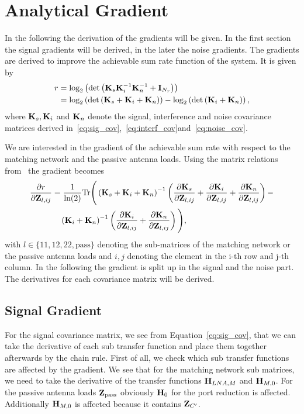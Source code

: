 \chapter{Analytical Gradient}

In the following the derivation of the gradients will be given.
In the first section the signal gradients will be derived, in the later the noise gradients.
The gradients are derived to improve the achievable sum rate function of the system.
It is given by
\begin{align}
\label{eq:sum_rate}
r &= \text{log}_2\left(\text{det}\left(
		\mathbf{K}_s\mathbf{K}_i^{-1}\mathbf{K}_n^{-1} + \mathbf{I}_{N_r}\right)\right)\\\nonumber 
&= \text{log}_2\left(\text{det}\left(
		\mathbf{K}_s+\mathbf{K}_i+\mathbf{K}_n\right)\right) -
		\text{log}_2\left(\text{det}\left(\mathbf{K}_i+\mathbf{K}_n\right)\right),
\end{align}
where $\mathbf{K}_s, \mathbf{K}_i$ and $\mathbf{K}_n$ denote the signal, interference and noise covariance matrices derived in~\eqref{eq:sig_cov},~\eqref{eq:interf_cov}and~\eqref{eq:noise_cov}.

We are interested in the gradient of the achievable sum rate with respect to the matching network and the passive antenna loads.
Using the matrix relations from~\cite{Codebook12} the gradient becomes
\begin{align}
\label{eq:gradient}\nonumber
\frac{\partial r}{\partial\mathbf{Z}_{l,ij}} &= \frac{1}{\text{ln}(2)} 
\text{Tr}\Bigg(\left(\mathbf{K}_s + \mathbf{K}_i + \mathbf{K}_n\right)^{-1}
\left(\frac{\partial\mathbf{K}_s}{\partial\mathbf{Z}_{l,ij}}+
 \frac{\partial\mathbf{K}_i}{\partial\mathbf{Z}_{l,ij}}+
 \frac{\partial\mathbf{K}_n}{\partial\mathbf{Z}_{l,ij}}\right)-\\
 &\quad\left(\mathbf{K}_i+\mathbf{K}_n\right)^{-1}
 \left(\frac{\partial\mathbf{K}_i}{\partial\mathbf{Z}_{l,ij}}+
 	\frac{\partial\mathbf{K}_n}{\partial\mathbf{Z}_{l,ij}}\right)\Bigg),
\end{align}
with $l\in\{11,12,22,\text{pass}\}$ denoting the sub-matrices of the matching network or the passive antenna loads and $i,j$ denoting the element in the i-th row and j-th column.
In the following the gradient is split up in the signal and the noise part.
The derivatives for each covariance matrix will be derived.

\section{Signal Gradient}
\label{sec:signal_gradient}
 For the signal covariance matrix, we see from Equation~\eqref{eq:sig_cov}, that we can take the derivative of each sub transfer function and place them together afterwards by the chain rule.
First of all, we check which sub transfer functions are affected by the gradient.
We see that for the matching network sub matrices, we need to take the derivative of the transfer functions $\mathbf{H}_{LNA,M}$ and $\mathbf{H}_{M,0}$.
For the passive antenna loads $\mathbf{Z}_\text{pass}$ obviously $\mathbf{H}_{0}$ for the port reduction is affected.
Additionally $\mathbf{H}_{M,0}$ is affected because it contains $\mathbf{Z}_{C'}$.


